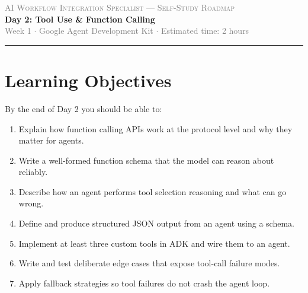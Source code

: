 \documentclass[12pt, a4paper]{article}
\begin{document}
\begin{center}
  {\small\textcolor{gray}{\textsc{AI Workflow Integration Specialist --- Self-Study Roadmap}}}\\[4pt]
  {\LARGE\bfseries\color{theoryblue} Day 2: Tool Use \& Function Calling}\\[6pt]
  {\small\textcolor{gray}{Week 1 $\cdot$ Google Agent Development Kit $\cdot$ Estimated time: 2 hours}}
\end{center}
\vspace{0.5em}
\hrule
\vspace{1.5em}

\section{Learning Objectives}

By the end of Day 2 you should be able to:

\begin{enumerate}[leftmargin=*, label=\textbf{\arabic*.}]
  \item Explain how function calling APIs work at the protocol level and why they matter for agents.
  \item Write a well-formed function schema that the model can reason about reliably.
  \item Describe how an agent performs tool selection reasoning and what can go wrong.
  \item Define and produce structured JSON output from an agent using a schema.
  \item Implement at least three custom tools in ADK and wire them to an agent.
  \item Write and test deliberate edge cases that expose tool-call failure modes.
  \item Apply fallback strategies so tool failures do not crash the agent loop.
\end{enumerate}

\vspace{1.5em}
\end{document}
